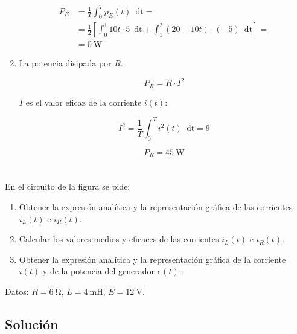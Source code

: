 \documentclass[10pt]{article}
\begin{document}
\begin{enumerate}
  \begin{align*}
    P_E &= \frac{1}{T} \int_0^T p_E(t) \enspace \mathrm{dt}=\\
        &= \frac{1}{2} \left[ \int_0^1 10t \cdot 5 \enspace \mathrm{dt} + \int_1^2 (20 - 10t) \cdot (-5) \enspace \mathrm{dt}  \right] =\\
        &=\SI{0}{\watt}
  \end{align*}

  
\item La potencia disipada por $R$.

  \[
    P_R = R \cdot I^2
  \]

  $I$ es el valor eficaz de la corriente $i(t)$:

  \[
    I^2 = \frac{1}{T} \int_0^T i^2(t) \enspace \mathrm{dt} = 9
  \]

  \[
    P_R = \SI{45}{\watt}
  \]
  
\end{enumerate}

\clearpage

\section{}

En el circuito de la figura se pide:

\begin{enumerate}
\item Obtener la expresión analítica y la representación gráfica de las corrientes $i_L(t)$ e $i_R(t)$.
\item Calcular los valores medios y eficaces de las corrientes $i_L(t)$ e $i_R(t)$.
\item Obtener la expresión analítica y la representación gráfica de la corriente $i(t)$ y de la potencia del generador $e(t)$.
\end{enumerate}

Datos: $R = \SI{6}{\ohm}$, $L = \SI{4}{\milli\henry}$, $E = \SI{12}{\volt}$.

\subsection*{Solución}
\end{document}
